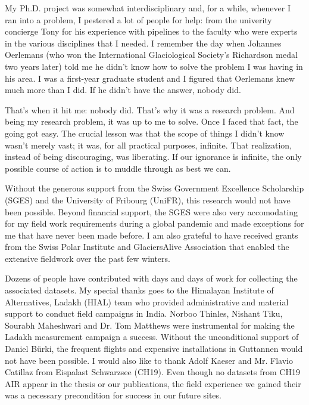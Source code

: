 My Ph.D. project was somewhat interdisciplinary and, for a while, whenever I ran into a problem, I pestered a
lot of people for help: from the univerity concierge Tony for his experience with pipelines to the faculty who
were experts in the various disciplines that I needed. I remember the day when Johannes Oerlemans (who won the
International Glaciological Society's Richardson medal two years later) told me he didn't know how to solve the
problem I was having in his area. I was a first-year graduate student and I figured that Oerlemans knew much
more than I did. If he didn't have the answer, nobody did.

That's when it hit me: nobody did. That's why it was a research problem. And being my research problem, it was
up to me to solve. Once I faced that fact, the going got easy. The crucial lesson was that the scope of things I
didn't know wasn't merely vast; it was, for all practical purposes, infinite. That realization, instead of being
discouraging, was liberating. If our ignorance is infinite, the only possible course of action is to muddle
through as best we can.

Without the generous support from the Swiss Government Excellence Scholarship (SGES) and the University of
Fribourg (UniFR), this research would not have been possible. Beyond financial support, the SGES were also very
accomodating for my field work requirements during a global pandemic and made exceptions for me that have never
been made before. I am also grateful to have received grants from the Swiss Polar Institute and GlaciersAlive
Association that enabled the extensive fieldwork over the past few winters. 

Dozens of people have contributed with days and days of work for collecting the associated datasets. My special
thanks goes to the Himalayan Institute of Alternatives, Ladakh (HIAL) team who provided administrative and
material support to conduct field campaigns in India. Norboo Thinles, Nishant Tiku, Sourabh Maheshwari and Dr.
Tom Matthews were instrumental for making the Ladakh measurement campaign a success. Without the unconditional
support of Daniel Bürki, the frequent flights and expensive installations in Guttannen would not have been
possible. I would also like to thank Adolf Kaeser and Mr. Flavio Catillaz from Eispalast Schwarzsee (CH19). Even
though no datasets from CH19 AIR appear in the thesis or our publications, the field experience we gained their
was a necessary precondition for success in our future sites. 

